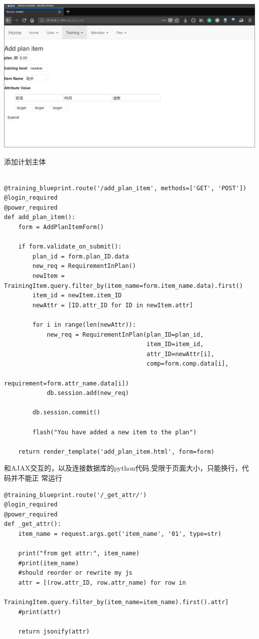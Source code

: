 \includegraphics[width=\textwidth]{figure/add-item-ajax2}


添加计划主体
\begin{Verbatim}[]
  
@training_blueprint.route('/add_plan_item', methods=['GET', 'POST'])
@login_required
@power_required
def add_plan_item():
    form = AddPlanItemForm()

    if form.validate_on_submit():
        plan_id = form.plan_ID.data
        new_req = RequirementInPlan()
        newItem = TrainingItem.query.filter_by(item_name=form.item_name.data).first()
        item_id = newItem.item_ID
        newAttr = [ID.attr_ID for ID in newItem.attr]

        for i in range(len(newAttr)):
            new_req = RequirementInPlan(plan_ID=plan_id,
                                        item_ID=item_id,
                                        attr_ID=newAttr[i],
                                        comp=form.comp.data[i],
                                        requirement=form.attr_name.data[i])
            db.session.add(new_req)

        db.session.commit()

        flash("You have added a new item to the plan")

    return render_template('add_plan_item.html', form=form)
\end{Verbatim}

和AJAX交互的，以及连接数据库的python代码,受限于页面大小，只能换行，代码并不能正
常运行
\begin{Verbatim}[]
@training_blueprint.route('/_get_attr/')
@login_required
@power_required
def _get_attr():
    item_name = request.args.get('item_name', '01', type=str)

    print("from get attr:", item_name)
    #print(item_name)
    #should reorder or rewrite my js
    attr = [(row.attr_ID, row.attr_name) for row in
    　　　　TrainingItem.query.filter_by(item_name=item_name).first().attr]
    #print(attr)

    return jsonify(attr)
\end{Verbatim}

